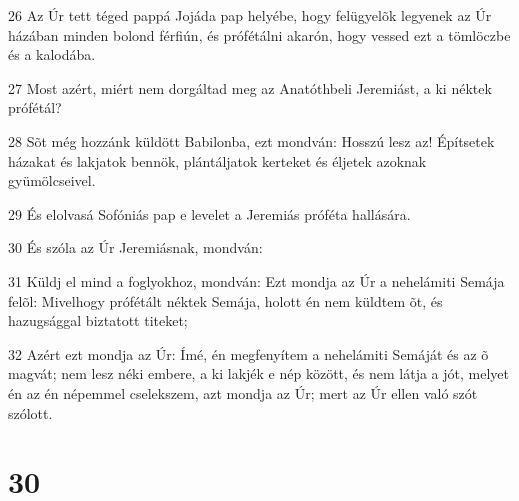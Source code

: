 \par 26 Az Úr tett téged pappá Jojáda pap helyébe, hogy felügyelõk legyenek az Úr házában minden bolond férfiún, és prófétálni akarón, hogy vessed ezt a tömlöczbe és a kalodába.
\par 27 Most azért, miért nem dorgáltad meg az Anatóthbeli Jeremiást, a ki néktek prófétál?
\par 28 Sõt még hozzánk küldött Babilonba, ezt mondván: Hosszú lesz az! Építsetek házakat és lakjatok bennök, plántáljatok kerteket és éljetek azoknak gyümölcseivel.
\par 29 És elolvasá Sofóniás pap e levelet a Jeremiás próféta hallására.
\par 30 És szóla az Úr Jeremiásnak, mondván:
\par 31 Küldj el mind a foglyokhoz, mondván: Ezt mondja az Úr a nehelámiti Semája felõl: Mivelhogy prófétált néktek Semája, holott én nem küldtem õt, és hazugsággal biztatott titeket;
\par 32 Azért ezt mondja az Úr: Ímé, én megfenyítem a nehelámiti Semáját és az õ magvát; nem lesz néki embere, a ki lakjék e nép között, és nem látja a jót, melyet én az én népemmel cselekszem, azt mondja az Úr; mert az Úr ellen való szót szólott.

\chapter{30}

